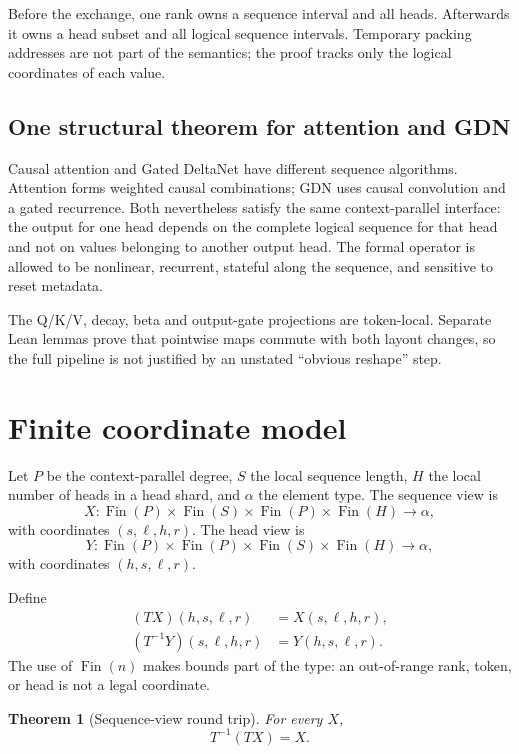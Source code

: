 \documentclass[11pt,a4paper]{article}
\newtheorem{theorem}{Theorem}
\newcommand{\Fin}{\operatorname{Fin}}
\begin{document}
Before the exchange, one rank owns a sequence interval and all heads. Afterwards it owns a head subset and all logical sequence intervals. Temporary packing addresses are not part of the semantics; the proof tracks only the logical coordinates of each value.

\subsection{One structural theorem for attention and GDN}

Causal attention and Gated DeltaNet have different sequence algorithms. Attention forms weighted causal combinations; GDN uses causal convolution and a gated recurrence. Both nevertheless satisfy the same context-parallel interface: the output for one head depends on the complete logical sequence for that head and not on values belonging to another output head. The formal operator is allowed to be nonlinear, recurrent, stateful along the sequence, and sensitive to reset metadata.

The Q/K/V, decay, beta and output-gate projections are token-local. Separate Lean lemmas prove that pointwise maps commute with both layout changes, so the full pipeline is not justified by an unstated ``obvious reshape'' step.

\section{Finite coordinate model}

Let $P$ be the context-parallel degree, $S$ the local sequence length, $H$ the local number of heads in a head shard, and $\alpha$ the element type. The sequence view is
\[
X:\Fin(P)\times\Fin(S)\times\Fin(P)\times\Fin(H)\to\alpha,
\]
with coordinates $(s,\ell,h,r)$. The head view is
\[
Y:\Fin(P)\times\Fin(P)\times\Fin(S)\times\Fin(H)\to\alpha,
\]
with coordinates $(h,s,\ell,r)$.

Define
\begin{align}
(TX)(h,s,\ell,r)&=X(s,\ell,h,r), \tag{1}\\
(T^{-1}Y)(s,\ell,h,r)&=Y(h,s,\ell,r). \tag{2}
\end{align}
The use of $\Fin(n)$ makes bounds part of the type: an out-of-range rank, token, or head is not a legal coordinate.

\begin{theorem}[Sequence-view round trip]
For every $X$,
\[
T^{-1}(TX)=X.
\]
\end{theorem}
\end{document}
